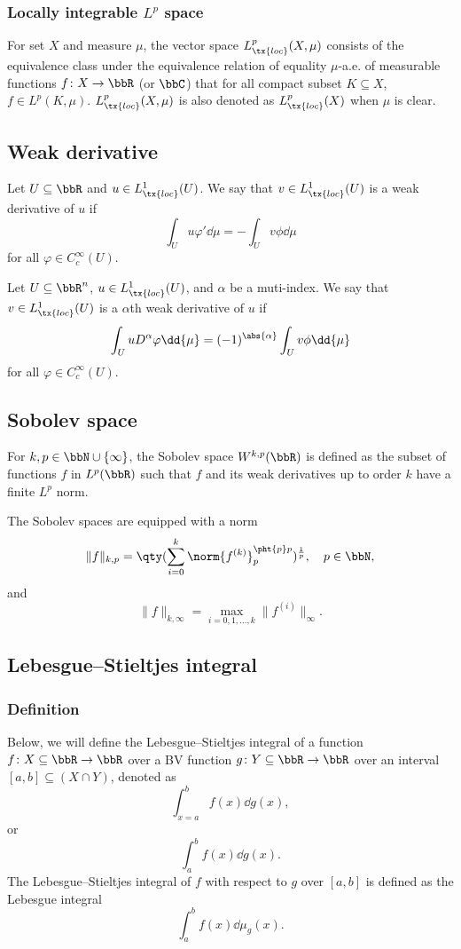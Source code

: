 \documentclass[a4paper,12pt]{report}
\begin{document}
\begin{itemize}
\begin{itemize}
\subsubsection{Locally integrable $L^p$ space}
For set $X$ and measure $\mu$, the vector space $L^p_{\tx{loc}}(X,\mu)$ consists of the equivalence class under the equivalence relation of equality $\mu$-a.e. of measurable functions $f\colon X\to\bbR$ (or $\bbC$) that for all compact subset $K\subseteq X$, $f\in L^p(K,\mu)$. $L^p_{\tx{loc}}(X,\mu)$ is also denoted as $L^p_{\tx{loc}}(X)$ when $\mu$ is clear.
\subsection{Weak derivative}
Let $U\subseteq\bbR$ and $u\in L^1_{\tx{loc}}(U)$. We say that $v\in L^1_{\tx{loc}}(U)$ is a weak derivative of $u$ if
\[\int_Uu\varphi'\dd{\mu}=-\int_Uv\phi\dd{\mu}\]
for all $\varphi\in C^{\infty}_c(U)$.

Let $U\subseteq\bbR^n$, $u\in L^1_{\tx{loc}}(U)$, and $\alpha$ be a muti-index. We say that $v\in L^1_{\tx{loc}}(U)$ is a $\alpha$th weak derivative of $u$ if
\[\int_UuD^{\alpha}\varphi\dd{\mu}=(-1)^{\abs{\alpha}}\int_Uv\phi\dd{\mu}\]
for all $\varphi\in C^{\infty}_c(U)$.
\subsection{Sobolev space}
For $k,p\in\bbN\cup\{\infty\}$, the Sobolev space $W^{k,p}(\bbR)$ is defined as the subset of functions $f$ in $L^p(\bbR)$ such that $f$ and its weak derivatives up to order $k$ have a finite $L^p$ norm.

The Sobolev spaces are equipped with a norm
\[\|f\|_{k,p}=\qty(\sum_{i=0}^k\norm{f^{(k)}}_p^{\pht{p}p})^{\frac{1}{p}},\quad p\in\bbN,\]
and
\[\|f\|_{k,\infty}=\max_{i=0,1,\ldots,k}\|f^{(i)}\|_{\infty}.\]
\subsection{Lebesgue–Stieltjes integral}
\subsubsection{Definition}
Below, we will define the Lebesgue–Stieltjes integral of a function $f\colon X\subseteq\bbR\to\bbR$ over a BV function $g\colon Y\subseteq\bbR\to\bbR$ over an interval $[a,b]\subseteq (X\cap Y)$, denoted as
\[\int_{x=a}^bf(x)\dd{g(x)},\]
or
\[\int_a^bf(x)\dd{g(x)}.\]
The Lebesgue–Stieltjes integral of $f$ with respect to $g$ over $[a,b]$ is defined as the Lebesgue integral
\[\int_a^bf(x)\dd{\mu_g(x)}.\]

\end{itemize}
\end{itemize}
\end{document}

